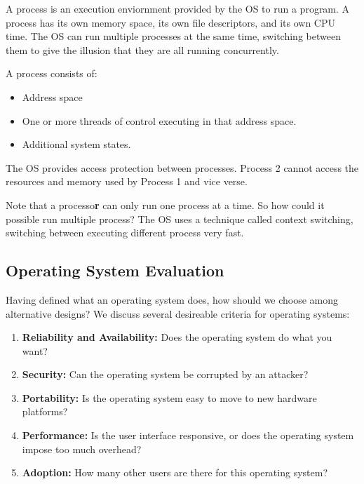 \documentclass{article}
\begin{document}
\begin{definition}[Process]
    A process is an execution enviornment provided by the OS to run a program. A process has its own memory space, its own file descriptors, and its own CPU time. The OS can run multiple processes at the same time, switching between them to give the illusion that they are all running concurrently.

    A process consists of:
    \begin{itemize}
        \item Address space
        \item One or more threads of control executing in that address space.
        \item Additional system states.
    \end{itemize}


    The OS provides access protection between processes. Process 2 cannot access the resources and memory used by Process 1 and vice verse.

    Note that a processo\textbf{r} can only run one process at a time. So how could it possible run multiple process? The OS uses a technique called context switching, switching between executing different process very fast.
\end{definition}

\subsection{Operating System Evaluation}

Having defined what an operating system does, how should we choose among alternative designs? We discuss several desireable criteria for operating systems:

\begin{enumerate}
    \item \textbf{Reliability and Availability:} Does the operating system do what you want?
    \item \textbf{Security:}  Can the operating system be corrupted by an attacker?
    \item \textbf{Portability:} Is the operating system easy to move to new hardware platforms?
    \item \textbf{Performance:} Is the user interface responsive, or does the operating system impose too much overhead?
    \item \textbf{Adoption:} How many other users are there for this operating system?
\end{enumerate}
\end{document}
